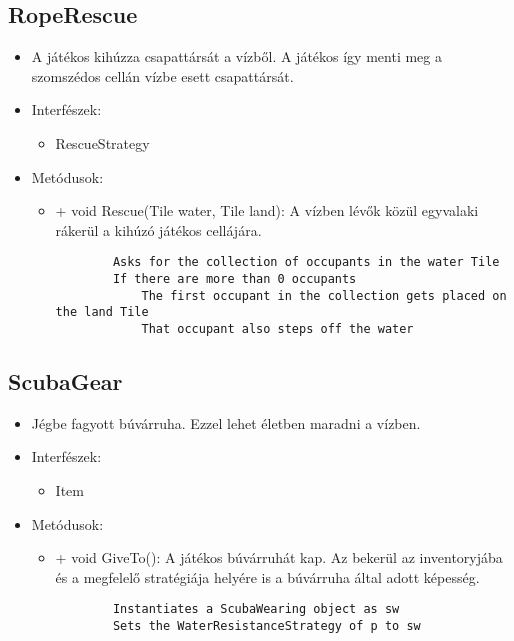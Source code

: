 \subsection{RopeRescue}
\begin{itemize}
	\item A játékos kihúzza csapattársát a vízből. A játékos így menti meg a szomszédos cellán vízbe esett csapattársát.
	\item Interfészek:
	\begin{itemize}
		\item RescueStrategy
	\end{itemize}
	\item Metódusok:
	\begin{itemize}
		\item + void Rescue(Tile water, Tile land): A vízben lévők közül egyvalaki rákerül a kihúzó játékos cellájára.
		\begin{lstlisting}
		Asks for the collection of occupants in the water Tile
		If there are more than 0 occupants
			The first occupant in the collection gets placed on the land Tile
			That occupant also steps off the water
		\end{lstlisting}
	\end{itemize}
\end{itemize}

\subsection{ScubaGear}
\begin{itemize}
	\item Jégbe fagyott búvárruha. Ezzel lehet életben maradni a vízben.
	\item Interfészek:
	\begin{itemize}
		\item Item
	\end{itemize}
	\item Metódusok:
	\begin{itemize}
		\item + void GiveTo(): A játékos búvárruhát kap. Az bekerül az inventoryjába és a megfelelő stratégiája helyére is a búvárruha által adott képesség.
		\begin{lstlisting}
		Instantiates a ScubaWearing object as sw
		Sets the WaterResistanceStrategy of p to sw
		\end{lstlisting}
	\end{itemize}
\end{itemize}

